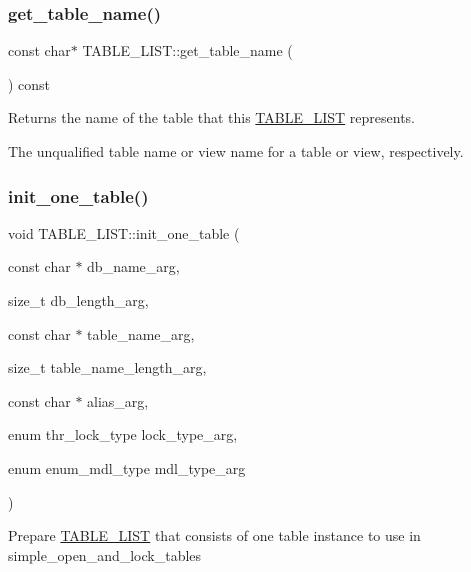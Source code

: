 \subsubsection{\texorpdfstring{get\+\_\+table\+\_\+name()}{get\_table\_name()}}
{\footnotesize\ttfamily const char$\ast$ T\+A\+B\+L\+E\+\_\+\+L\+I\+S\+T\+::get\+\_\+table\+\_\+name (\begin{DoxyParamCaption}{ }\end{DoxyParamCaption}) const\hspace{0.3cm}{\ttfamily [inline]}}



Returns the name of the table that this \mbox{\hyperlink{structTABLE__LIST}{T\+A\+B\+L\+E\+\_\+\+L\+I\+ST}} represents. 

The unqualified table name or view name for a table or view, respectively. \mbox{\label{structTABLE__LIST_a2570739fd11fcfb3bcd5050253b3c7fc}} 
\subsubsection{\texorpdfstring{init\+\_\+one\+\_\+table()}{init\_one\_table()}}
{\footnotesize\ttfamily void T\+A\+B\+L\+E\+\_\+\+L\+I\+S\+T\+::init\+\_\+one\+\_\+table (\begin{DoxyParamCaption}\item[{const char $\ast$}]{db\+\_\+name\+\_\+arg,  }\item[{size\+\_\+t}]{db\+\_\+length\+\_\+arg,  }\item[{const char $\ast$}]{table\+\_\+name\+\_\+arg,  }\item[{size\+\_\+t}]{table\+\_\+name\+\_\+length\+\_\+arg,  }\item[{const char $\ast$}]{alias\+\_\+arg,  }\item[{enum thr\+\_\+lock\+\_\+type}]{lock\+\_\+type\+\_\+arg,  }\item[{enum enum\+\_\+mdl\+\_\+type}]{mdl\+\_\+type\+\_\+arg }\end{DoxyParamCaption})\hspace{0.3cm}{\ttfamily [inline]}}

Prepare \mbox{\hyperlink{structTABLE__LIST}{T\+A\+B\+L\+E\+\_\+\+L\+I\+ST}} that consists of one table instance to use in simple\+\_\+open\+\_\+and\+\_\+lock\+\_\+tables \mbox{\label{structTABLE__LIST_a644a278cc3ca2f3d85f5ca1ce8187878}} 
